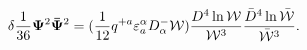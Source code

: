 \begin{equation}\label{first}
\delta\frac{1}{36}{\bf\Psi}^2{\bf\bar{\Psi}}^2 = (\frac{1}{12}q^{+
a}\varepsilon^{\alpha}_a D^-_{\alpha}{\cal W})\frac{D^4 \ln{\cal
W}}{{\cal W}^3}\frac {\bar{D}^4\ln \bar{\cal W}}{\bar{\cal W}^3}.
\end{equation}

